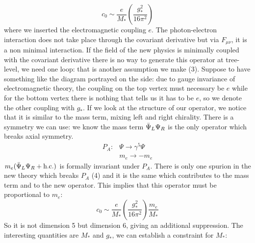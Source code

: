\documentclass[../main.tex]{subfiles}
\begin{document}
\begin{example}
\[
c_0\sim\frac{e}{M_*}\left(\frac{g_*^2}{16\pi^2}\right)
\]
where we inserted the electromagnetic coupling $e$. The photon-electron interaction does not take place through the covariant derivative but via $F_{\mu\nu}$, it is a non minimal interaction. If the field of the new physics is minimally coupled with the covariant derivative there is no way to generate this operator at tree-level, we need one loop: that is another assumption we make (3). Suppose to have something like the diagram portrayed on the side: due to gauge invariance of electromagnetic theory, the coupling on the top vertex must necessary be $e$ while for the bottom vertex there is nothing that tells us it has to be $e$, so we denote the other coupling with $g_*$. If we look at the structure of our operator, we notice that it is similar to the mass term, mixing left and right chirality. There is a symmetry we can use: we know the mass term $\Bar{\Psi}_L\Psi_R$ is the only operator which breaks axial symmetry.
\[
\begin{aligned}
P_A:&\Psi\to\gamma^5\Psi\\
&m_e\to-m_e
\end{aligned}
\]
$m_e(\Bar{\Psi}_L\Psi_R+\text{h.c.})$ is formally invariant under $P_A$. There is only one spurion in the new theory which breaks $P_A$ (4) and it is the same which contributes to the mass term and to the new operator. This implies that this operator must be proportional to $m_e$:
\[
c_0\sim\frac{e}{M_*}\left(\frac{g_*^2}{16\pi^2}\right)\frac{m_e}{M_*}
\]
So it is not dimension 5 but dimension 6, giving an additional suppression. The interesting quantities are $M_*$ and $g_*$, we can establish a constraint for $M_*$:

\end{example}
\end{document}
